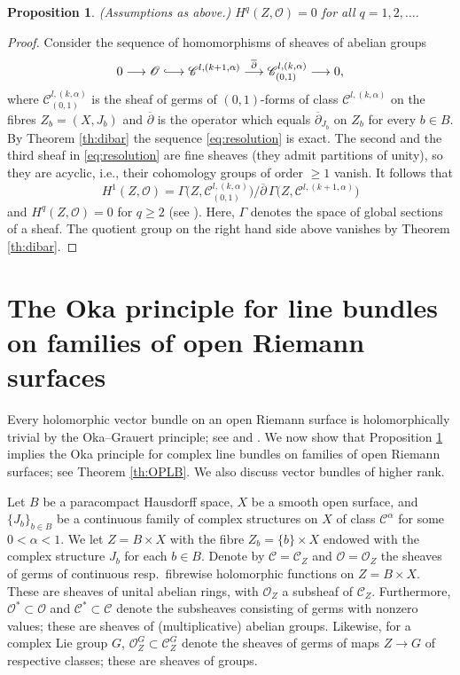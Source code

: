 \documentclass[11pt]{amsart}
\numberwithin{equation}{section}
\newtheorem{proposition}[theorem]{Proposition}
\theoremstyle{definition}
\newcommand\Cscr{\mathscr{C}}
\newcommand\Oscr{\mathscr{O}}
\newcommand\lra{\longrightarrow}
\newcommand\longhookrightarrow{\ensuremath{\lhook\joinrel\relbar\joinrel\rightarrow}}
\newcommand\dibar{\overline\partial}
\begin{document}
%
%
\begin{proposition}\label{prop:Dolbeault}
(Assumptions as above.) %
$H^q(Z,\Oscr)=0$ for all $q=1,2,\ldots$.
\end{proposition}

\begin{proof}
Consider the sequence of homomorphisms of sheaves of abelian groups
\begin{equation}\label{eq:resolution}
	0\lra \Oscr \longhookrightarrow \Cscr^{l,(k+1,\alpha)}
	\stackrel{\dibar}{\lra} \Cscr^{l,(k,\alpha)}_{(0,1)} \lra 0,
\end{equation}
where $\Cscr^{l,(k,\alpha)}_{(0,1)}$ is the sheaf of germs 
of $(0,1)$-forms of class $\Cscr^{l,(k,\alpha)}$ on the fibres 
$Z_b=(X,J_b)$ and $\dibar$ is the operator 
which equals $\dibar_{J_b}$ on $Z_b$ for every $b\in B$. 
By Theorem \ref{th:dibar} the sequence \eqref{eq:resolution} is exact.
The second and the third sheaf in \eqref{eq:resolution} 
are fine sheaves (they admit partitions of unity), so they are acyclic,
i.e., their cohomology groups of order $\ge 1$ vanish. It follows that
\[ 
	H^1(Z,\Oscr)= \Gamma\big(Z,\Cscr^{l,(k,\alpha)}_{(0,1)}\big)/
	\dibar \, \Gamma\big(Z,\Cscr^{l,(k+1,\alpha)}\big)
\] 
and $H^q(Z,\Oscr)=0$ for $q\ge 2$ 
(see \cite[Chapter VI]{GunningRossi1965}). 
Here, $\Gamma$ denotes the space of global sections of a sheaf. 
The quotient group on the right hand side above
vanishes by Theorem \ref{th:dibar}.
\end{proof}


%
%
%
\section{The Oka principle for line bundles
on families of open Riemann surfaces}

%
%
Every holomorphic vector bundle on an 
open Riemann surface is holomorphically trivial by the Oka--Grauert principle; see \cite{Oka1939,Grauert1958MA} 
and \cite[Theorem 5.3.1]{Forstneric2017E}.
We now show that Proposition \ref{prop:Dolbeault} implies
the Oka principle for complex line bundles on families
of open Riemann surfaces; see Theorem \ref{th:OPLB}.
We also discuss vector bundles of higher rank.

Let $B$ be a paracompact Hausdorff space, $X$ be a smooth
open surface, and $\{J_b\}_{b\in B}$ be a continuous family of complex
structures on $X$ of class $\Cscr^{\alpha}$ for some $0<\alpha<1$.
We let $Z=B\times X$ with the fibre $Z_b=\{b\}\times X$ endowed
with the complex structure $J_b$ for each $b\in B$.
Denote by $\Cscr=\Cscr_Z$ and $\Oscr=\Oscr_Z$
the sheaves of germs of continuous resp.\ 
fibrewise holomorphic functions on $Z=B\times X$.
These are sheaves of unital abelian rings, with $\Oscr_Z$ a subsheaf
of $\Cscr_Z$. Furthermore, $\Oscr^*\subset \Oscr$ and 
$\Cscr^*\subset \Cscr$ denote the subsheaves consisting 
of germs with nonzero values; 
these are sheaves of (multiplicative) abelian groups.
Likewise, for a complex Lie group $G$, $\Oscr_Z^G\subset \Cscr_Z^G$ 
denote the sheaves of germs of maps $Z\to G$ of respective classes; 
these are sheaves of groups. %
\end{document}
